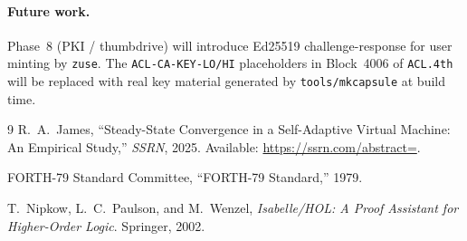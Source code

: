 \documentclass[11pt,letterpaper,openany]{article}
\begin{document}
\paragraph{Future work.}
Phase~8 (PKI / thumbdrive) will introduce Ed25519 challenge-response
for user minting by \texttt{zuse}.  The \texttt{ACL-CA-KEY-LO/HI}
placeholders in Block~4006 of \texttt{ACL.4th} will be replaced with
real key material generated by \texttt{tools/mkcapsule} at build time.

\begin{thebibliography}{9}
  R.~A.~James,
  ``Steady-State Convergence in a Self-Adaptive Virtual Machine:
    An Empirical Study,''
  \textit{SSRN}, 2025.
  Available: \url{https://ssrn.com/abstract=}.

  FORTH-79 Standard Committee,
  ``FORTH-79 Standard,'' 1979.

  T.~Nipkow, L.~C.~Paulson, and M.~Wenzel,
  \textit{Isabelle/HOL: A Proof Assistant for Higher-Order Logic}.
  Springer, 2002.
\end{thebibliography}
\end{document}
